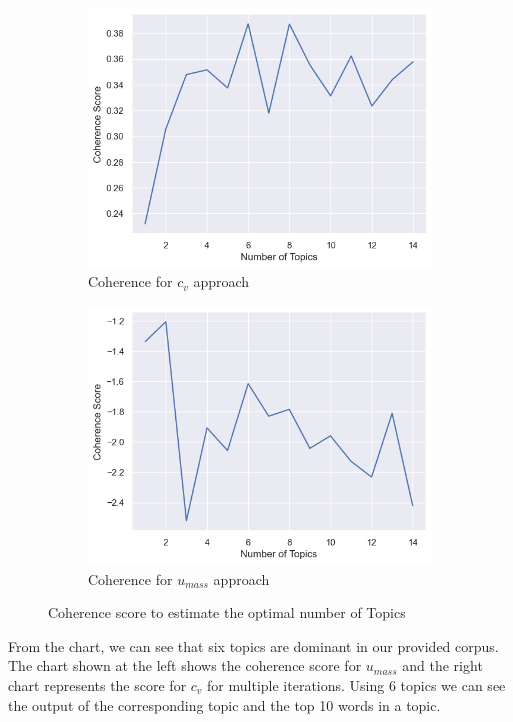 \documentclass[sn-mathphys,Numbered]{sn-jnl}%
\theoremstyle{thmstyleone}%
\theoremstyle{thmstyletwo}%
\theoremstyle{thmstylethree}%
\begin{document}
\begin{figure}[h!] \centering \begin{subfigure}{0.45\textwidth}
 \includegraphics[width=\textwidth]{cv.png} \caption{Coherence for $c_v$ approach} 
 \end{subfigure}
  \hfill \begin{subfigure}{0.45\textwidth} 
 \includegraphics[width=\textwidth]{umass.png} \caption{Coherence for $u_{mass}$ approach} 
\end{subfigure} 
\caption{Coherence score to estimate the optimal number of Topics} 
\label{cv_umass} 
\end{figure}

 From the chart, we can see that six topics are dominant in our provided corpus. The chart shown at the left shows the coherence score for \(u_{mass}\) and the right chart represents the score for \(c_{v}\) for multiple iterations. Using 6 topics we can see the output of the corresponding topic and the top 10 words in a topic.
\end{document}
